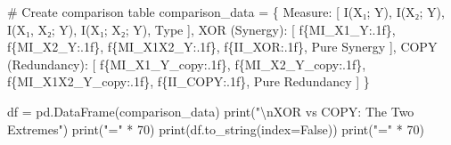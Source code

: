 \documentclass[
  11pt,
  letterpaper,
  oneside,
  openany]{book}
\newenvironment{Shaded}{\begin{snugshade}}{\end{snugshade}}
\newcommand{\BuiltInTok}[1]{\textcolor[rgb]{0.00,0.23,0.31}{#1}}
\newcommand{\CharTok}[1]{\textcolor[rgb]{0.13,0.47,0.30}{#1}}
\newcommand{\CommentTok}[1]{\textcolor[rgb]{0.37,0.37,0.37}{#1}}
\newcommand{\DecValTok}[1]{\textcolor[rgb]{0.68,0.00,0.00}{#1}}
\newcommand{\NormalTok}[1]{\textcolor[rgb]{0.00,0.23,0.31}{#1}}
\newcommand{\OperatorTok}[1]{\textcolor[rgb]{0.37,0.37,0.37}{#1}}
\newcommand{\SpecialCharTok}[1]{\textcolor[rgb]{0.37,0.37,0.37}{#1}}
\newcommand{\SpecialStringTok}[1]{\textcolor[rgb]{0.13,0.47,0.30}{#1}}
\newcommand{\StringTok}[1]{\textcolor[rgb]{0.13,0.47,0.30}{#1}}
\newcommand{\VariableTok}[1]{\textcolor[rgb]{0.07,0.07,0.07}{#1}}
\begin{document}
\begin{Shaded}
\begin{Highlighting}[]
\CommentTok{\# Create comparison table}
\NormalTok{comparison\_data }\OperatorTok{=}\NormalTok{ \{}
    \StringTok{\textquotesingle{}Measure\textquotesingle{}}\NormalTok{: [}
        \StringTok{\textquotesingle{}I(X₁; Y)\textquotesingle{}}\NormalTok{,}
        \StringTok{\textquotesingle{}I(X₂; Y)\textquotesingle{}}\NormalTok{,}
        \StringTok{\textquotesingle{}I(X₁, X₂; Y)\textquotesingle{}}\NormalTok{,}
        \StringTok{\textquotesingle{}I(X₁; X₂; Y)\textquotesingle{}}\NormalTok{,}
        \StringTok{\textquotesingle{}Type\textquotesingle{}}
\NormalTok{    ],}
    \StringTok{\textquotesingle{}XOR (Synergy)\textquotesingle{}}\NormalTok{: [}
        \SpecialStringTok{f\textquotesingle{}}\SpecialCharTok{\{}\NormalTok{MI\_X1\_Y}\SpecialCharTok{:.1f\}}\SpecialStringTok{\textquotesingle{}}\NormalTok{,}
        \SpecialStringTok{f\textquotesingle{}}\SpecialCharTok{\{}\NormalTok{MI\_X2\_Y}\SpecialCharTok{:.1f\}}\SpecialStringTok{\textquotesingle{}}\NormalTok{,}
        \SpecialStringTok{f\textquotesingle{}}\SpecialCharTok{\{}\NormalTok{MI\_X1X2\_Y}\SpecialCharTok{:.1f\}}\SpecialStringTok{\textquotesingle{}}\NormalTok{,}
        \SpecialStringTok{f\textquotesingle{}}\SpecialCharTok{\{}\NormalTok{II\_XOR}\SpecialCharTok{:.1f\}}\SpecialStringTok{\textquotesingle{}}\NormalTok{,}
        \StringTok{\textquotesingle{}Pure Synergy\textquotesingle{}}
\NormalTok{    ],}
    \StringTok{\textquotesingle{}COPY (Redundancy)\textquotesingle{}}\NormalTok{: [}
        \SpecialStringTok{f\textquotesingle{}}\SpecialCharTok{\{}\NormalTok{MI\_X1\_Y\_copy}\SpecialCharTok{:.1f\}}\SpecialStringTok{\textquotesingle{}}\NormalTok{,}
        \SpecialStringTok{f\textquotesingle{}}\SpecialCharTok{\{}\NormalTok{MI\_X2\_Y\_copy}\SpecialCharTok{:.1f\}}\SpecialStringTok{\textquotesingle{}}\NormalTok{,}
        \SpecialStringTok{f\textquotesingle{}}\SpecialCharTok{\{}\NormalTok{MI\_X1X2\_Y\_copy}\SpecialCharTok{:.1f\}}\SpecialStringTok{\textquotesingle{}}\NormalTok{,}
        \SpecialStringTok{f\textquotesingle{}}\SpecialCharTok{\{}\NormalTok{II\_COPY}\SpecialCharTok{:.1f\}}\SpecialStringTok{\textquotesingle{}}\NormalTok{,}
        \StringTok{\textquotesingle{}Pure Redundancy\textquotesingle{}}
\NormalTok{    ]}
\NormalTok{\}}

\NormalTok{df }\OperatorTok{=}\NormalTok{ pd.DataFrame(comparison\_data)}
\BuiltInTok{print}\NormalTok{(}\StringTok{"}\CharTok{\textbackslash{}n}\StringTok{XOR vs COPY: The Two Extremes"}\NormalTok{)}
\BuiltInTok{print}\NormalTok{(}\StringTok{"="} \OperatorTok{*} \DecValTok{70}\NormalTok{)}
\BuiltInTok{print}\NormalTok{(df.to\_string(index}\OperatorTok{=}\VariableTok{False}\NormalTok{))}
\BuiltInTok{print}\NormalTok{(}\StringTok{"="} \OperatorTok{*} \DecValTok{70}\NormalTok{)}


\end{Highlighting}
\end{Shaded}
\end{document}
